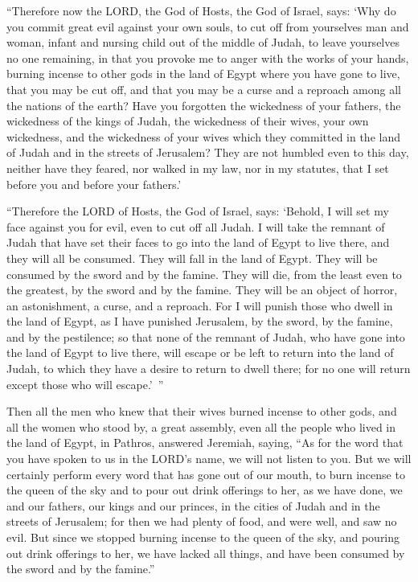 \myverse{}“Therefore now the LORD, the God of Hosts, the God of Israel, says: ‘Why do you commit great evil against your own souls, to cut off from yourselves man and woman, infant and nursing child out of the middle of Judah, to leave yourselves no one remaining, \myverse{}in that you provoke me to anger with the works of your hands, burning incense to other gods in the land of Egypt where you have gone to live, that you may be cut off, and that you may be a curse and a reproach among all the nations of the earth? \myverse{}Have you forgotten the wickedness of your fathers, the wickedness of the kings of Judah, the wickedness of their wives, your own wickedness, and the wickedness of your wives which they committed in the land of Judah and in the streets of Jerusalem? \myverse{}They are not humbled even to this day, neither have they feared, nor walked in my law, nor in my statutes, that I set before you and before your fathers.’


\myverse{}“Therefore the LORD of Hosts, the God of Israel, says: ‘Behold, I will set my face against you for evil, even to cut off all Judah. \myverse{}I will take the remnant of Judah that have set their faces to go into the land of Egypt to live there, and they will all be consumed. They will fall in the land of Egypt. They will be consumed by the sword and by the famine. They will die, from the least even to the greatest, by the sword and by the famine. They will be an object of horror, an astonishment, a curse, and a reproach. \myverse{}For I will punish those who dwell in the land of Egypt, as I have punished Jerusalem, by the sword, by the famine, and by the pestilence; \myverse{}so that none of the remnant of Judah, who have gone into the land of Egypt to live there, will escape or be left to return into the land of Judah, to which they have a desire to return to dwell there; for no one will return except those who will escape.’ ”


\myverse{}Then all the men who knew that their wives burned incense to other gods, and all the women who stood by, a great assembly, even all the people who lived in the land of Egypt, in Pathros, answered Jeremiah, saying, \myverse{}“As for the word that you have spoken to us in the LORD’s name, we will not listen to you. \myverse{}But we will certainly perform every word that has gone out of our mouth, to burn incense to the queen of the sky and to pour out drink offerings to her, as we have done, we and our fathers, our kings and our princes, in the cities of Judah and in the streets of Jerusalem; for then we had plenty of food, and were well, and saw no evil. \myverse{}But since we stopped burning incense to the queen of the sky, and pouring out drink offerings to her, we have lacked all things, and have been consumed by the sword and by the famine.”



